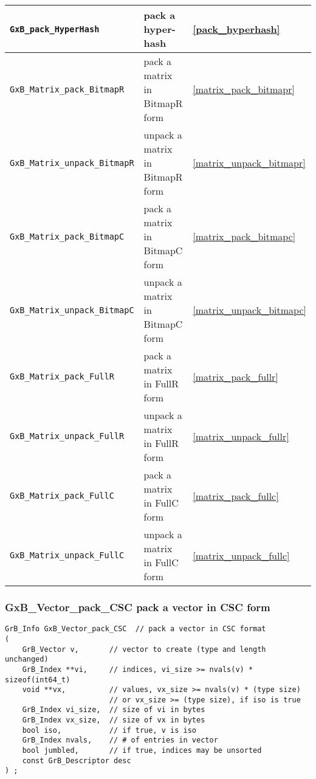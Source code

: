 \documentclass[12pt]{article}
\begin{document}
{\begin{tabular}{lll}
\verb'GxB_pack_HyperHash'   & pack a hyper-hash & \ref{pack_hyperhash} \\
\hline
\verb'GxB_Matrix_pack_BitmapR'    & pack a matrix in BitmapR form & \ref{matrix_pack_bitmapr} \\
\verb'GxB_Matrix_unpack_BitmapR'  & unpack a matrix in BitmapR form & \ref{matrix_unpack_bitmapr} \\
\hline
\verb'GxB_Matrix_pack_BitmapC'    & pack a matrix in BitmapC form & \ref{matrix_pack_bitmapc} \\
\verb'GxB_Matrix_unpack_BitmapC'  & unpack a matrix in BitmapC form & \ref{matrix_unpack_bitmapc} \\
\hline
\verb'GxB_Matrix_pack_FullR'      & pack a matrix in FullR form & \ref{matrix_pack_fullr} \\
\verb'GxB_Matrix_unpack_FullR'    & unpack a matrix in FullR form & \ref{matrix_unpack_fullr} \\
\hline
\verb'GxB_Matrix_pack_FullC'      & pack a matrix in FullC form & \ref{matrix_pack_fullc} \\
\verb'GxB_Matrix_unpack_FullC'    & unpack a matrix in FullC form & \ref{matrix_unpack_fullc} \\
\hline
\end{tabular}
}

\newpage
\subsubsection{{\sf GxB\_Vector\_pack\_CSC} pack a vector in CSC form}
\label{vector_pack_csc}

\begin{mdframed}[userdefinedwidth=6in]
{\footnotesize
\begin{verbatim}
GrB_Info GxB_Vector_pack_CSC  // pack a vector in CSC format
(
    GrB_Vector v,       // vector to create (type and length unchanged)
    GrB_Index **vi,     // indices, vi_size >= nvals(v) * sizeof(int64_t)
    void **vx,          // values, vx_size >= nvals(v) * (type size)
                        // or vx_size >= (type size), if iso is true
    GrB_Index vi_size,  // size of vi in bytes
    GrB_Index vx_size,  // size of vx in bytes
    bool iso,           // if true, v is iso
    GrB_Index nvals,    // # of entries in vector
    bool jumbled,       // if true, indices may be unsorted
    const GrB_Descriptor desc
) ;
\end{verbatim}
} \end{mdframed}
\end{document}
